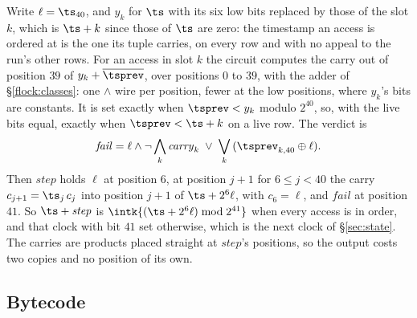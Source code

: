 Write $\ell=\ts_{40}$, and $y_k$ for $\ts$ with its six low bits replaced by those of the slot $k$, which is $\ts+k$ since those of $\ts$ are zero: the timestamp an access is ordered at is the one its tuple carries, on every row and with no appeal to the run's other rows. For an access in slot $k$ the circuit computes the carry out of position $39$ of $y_k+\overline{\tsprev}$, over positions $0$ to $39$, with the adder of \S\ref{flock:classes}: one $\wedge$ wire per position, fewer at the low positions, where $y_k$'s bits are constants. It is set exactly when $\tsprev<y_k$ modulo $2^{40}$, so, with the live bits equal, exactly when $\tsprev<\ts+k$ on a live row. The verdict is
\[
  \mathit{fail}=\ell\wedge\neg\bigwedge_k \mathit{carry}_k\;\vee\;\bigvee_k\,(\tsprev_{k,40}\oplus\ell).
\]
Then $\mathit{step}$ holds $\ell$ at position $6$, at position $j+1$ for $6\le j<40$ the carry $c_{j+1}=\ts_j\,c_j$ into position $j+1$ of $\ts+2^{6}\ell$, with $c_6=\ell$, and $\mathit{fail}$ at position $41$. So $\ts+\mathit{step}$ is $\intk{(\ts+2^{6}\ell)\bmod2^{41}}$ when every access is in order, and that clock with bit $41$ set otherwise, which is the next clock of \S\ref{sec:state}. The carries are products placed straight at $\mathit{step}$'s positions, so the output costs two copies and no position of its own.

\subsection{Bytecode}\label{sec:bytecode}

